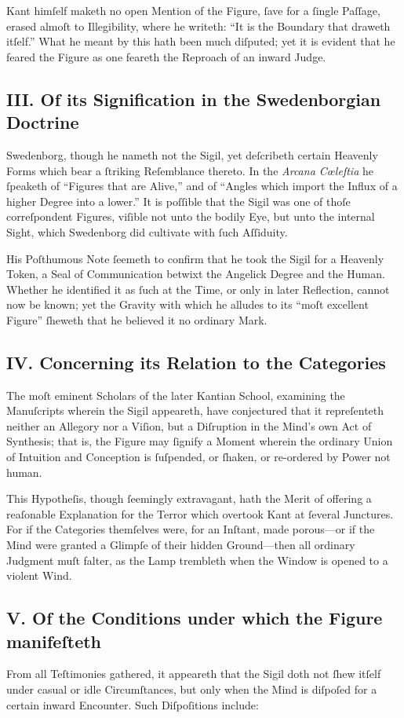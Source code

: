 \documentclass[12pt]{article}
\begin{document}
Kant himſelf maketh no open Mention of the Figure, ſave for a ſingle 
Paſſage, erased almoſt to Illegibility, where he writeth: ``It is the 
Boundary that draweth itſelf.'' What he meant by this hath been much 
diſputed; yet it is evident that he feared the Figure as one feareth the 
Reproach of an inward Judge.

\subsection*{III. Of its Signification in the Swedenborgian Doctrine}
Swedenborg, though he nameth not the Sigil, yet deſcribeth certain 
Heavenly Forms which bear a ſtriking Reſemblance thereto. In the \textit{Arcana 
Cœleſtia} he ſpeaketh of ``Figures that are Alive,'' and of ``Angles which 
import the Influx of a higher Degree into a lower.'' It is poſſible that the 
Sigil was one of thoſe correſpondent Figures, viſible not unto the bodily 
Eye, but unto the internal Sight, which Swedenborg did cultivate with ſuch 
Aſſiduity.

His Poſthumous Note ſeemeth to confirm that he took the Sigil for a 
Heavenly Token, a Seal of Communication betwixt the Angelick Degree and the 
Human. Whether he identified it as ſuch at the Time, or only in later 
Reflection, cannot now be known; yet the Gravity with which he alludes to 
its ``moſt excellent Figure'' ſheweth that he believed it no ordinary Mark.

\subsection*{IV. Concerning its Relation to the Categories}
The moſt eminent Scholars of the later Kantian School, examining the 
Manuſcripts wherein the Sigil appeareth, have conjectured that it repreſenteth 
neither an Allegory nor a Viſion, but a Diſruption in the Mind’s own Act of 
Synthesis; that is, the Figure may ſignify a Moment wherein the ordinary 
Union of Intuition and Conception is ſuſpended, or ſhaken, or re-ordered by 
Power not human.

This Hypotheſis, though ſeemingly extravagant, hath the Merit of offering a 
reaſonable Explanation for the Terror which overtook Kant at ſeveral 
Junctures. For if the Categories themſelves were, for an Inſtant, made 
porous—or if the Mind were granted a Glimpſe of their hidden Ground—then 
all ordinary Judgment muſt falter, as the Lamp trembleth when the Window is 
opened to a violent Wind.

\subsection*{V. Of the Conditions under which the Figure manifeſteth}
From all Teſtimonies gathered, it appeareth that the Sigil doth not ſhew itſelf 
under casual or idle Circumſtances, but only when the Mind is diſpoſed for a 
certain inward Encounter. Such Diſpoſitions include:
\end{document}
